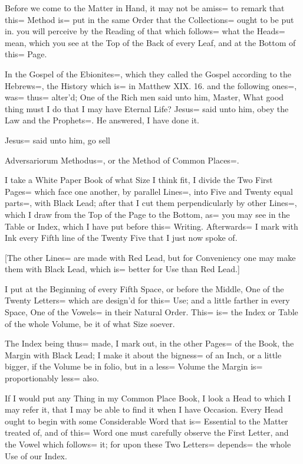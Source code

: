 Before we come to the Matter in Hand, it may not be amiss= to remark that this= Method is= put in the same Order that the Collections= ought to be put in.
you will perceive by the Reading of that which follows= what the Heads= mean, which you see at the Top of the Back of every Leaf, and at the Bottom of this= Page.

In the Gospel of the Ebionites=, which they called the Gospel according to the Hebrews=, the History which is= in Matthew XIX.
16.
and the following ones=, was= thus= alter'd;
One of the Rich men said unto him, Master, What good thing must I do that I may have Eternal Life?
Jesus= said unto him, obey the Law and the Prophets=.
He answered, I have done it.

Jesus= said unto him, go sell

Adversariorum Methodus=, or the Method of Common Places=.

I take a White Paper Book of what Size I think fit, I divide the Two First Pages= which face one another, by parallel Lines=, into Five and Twenty equal parts=, with Black Lead;
after that I cut them perpendicularly by other Lines=, which I draw from the Top of the Page to the Bottom, as= you may see in the Table or Index, which I have put before this= Writing.
Afterwards= I mark with Ink every Fifth line of the Twenty Five that I just now spoke of.

[The other Lines= are made with Red Lead, but for Conveniency one may make them with Black Lead, which is= better for Use than Red Lead.]

I put at the Beginning of every Fifth Space, or before the Middle, One of the Twenty Letters= which are design'd for this= Use;
and a little farther in every Space, One of the Vowels= in their Natural Order.
This= is= the Index or Table of the whole Volume, be it of what Size soever.

The Index being thus= made, I mark out, in the other Pages= of the Book, the Margin with Black Lead;
I make it about the bigness= of an Inch, or a little bigger, if the Volume be in folio, but in a less= Volume the Margin is= proportionably less= also.

If I would put any Thing in my Common Place Book, I look a Head to which I may refer it, that I may be able to find it when I have Occasion.
Every Head ought to begin with some Considerable Word that is= Essential to the Matter treated of, and of this= Word one must carefully observe the First Letter, and the Vowel which follows= it;
for upon these Two Letters= depends= the whole Use of our Index.

